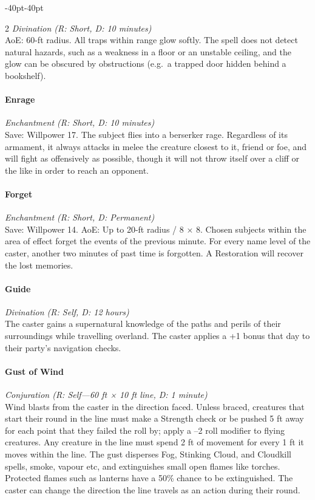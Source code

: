 \documentclass{book}
\begin{document}
\begin{adjustwidth}{-40pt}{-40pt}
\begin{multicols}{2}
\emph{Divination (R: Short, D: 10 minutes)}\\
AoE: 60-ft radius. All traps within range glow softly. The spell does
not detect natural hazards, such as a weakness in a floor or an unstable
ceiling, and the glow can be obscured by obstructions (e.g.~a trapped
door hidden behind a bookshelf).

\paragraph{Enrage}\label{enrage}

\emph{Enchantment (R: Short, D: 10 minutes)}\\
Save: Willpower 17. The subject flies into a berserker rage. Regardless
of its armament, it always attacks in melee the creature closest to it,
friend or foe, and will fight as offensively as possible, though it will
not throw itself over a cliff or the like in order to reach an opponent.

\paragraph{Forget}\label{forget}

\emph{Enchantment (R: Short, D: Permanent)}\\
Save: Willpower 14. AoE: Up to 20-ft radius / 8 × 8. Chosen subjects
within the area of effect forget the events of the previous minute. For
every name level of the caster, another two minutes of past time is
forgotten. A Restoration will recover the lost memories.

\paragraph{Guide}\label{guide}

\emph{Divination (R: Self, D: 12 hours)}\\
The caster gains a supernatural knowledge of the paths and perils of
their surroundings while travelling overland. The caster applies a +1
bonus that day to their party's navigation checks.

\paragraph{Gust of Wind}\label{gust-of-wind}

\emph{Conjuration (R: Self---60 ft × 10 ft line, D: 1 minute)}\\
Wind blasts from the caster in the direction faced. Unless braced,
creatures that start their round in the line must make a Strength check
or be pushed 5 ft away for each point that they failed the roll by;
apply a --2 roll modifier to flying creatures. Any creature in the line
must spend 2 ft of movement for every 1 ft it moves within the line. The
gust disperses Fog, Stinking Cloud, and Cloudkill spells, smoke, vapour
etc, and extinguishes small open flames like torches. Protected flames
such as lanterns have a 50\% chance to be extinguished. The caster can
change the direction the line travels as an action during their round.


\end{multicols}
\end{adjustwidth}
\end{document}
